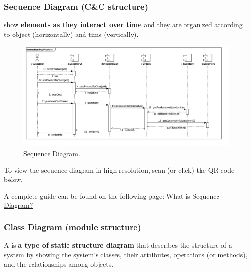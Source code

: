 \newpage

\subsubsection{Sequence Diagram (C\&C structure)}

 show \textbf{elements as they interact over time} and they are organized according to object (horizontally) and time (vertically).

\begin{figure}[!htp]
    \centering
    \includegraphics[width=\textwidth]{img/sequence-diagram.png}
    \caption{Sequence Diagram.}
\end{figure}

\noindent
To view the sequence diagram in high resolution, scan (or click) the QR code below.
\begin{center}
\end{center}
A complete guide can be found on the following page: \href{https://www.visual-paradigm.com/guide/uml-unified-modeling-language/what-is-sequence-diagram/}{What is Sequence Diagram?
}

\newpage

\subsubsection{Class Diagram (module structure)}

A  is \textbf{a type of static structure diagram} that describes the structure of a system by showing the system's classes, their attributes, operations (or methods), and the relationships among objects.

